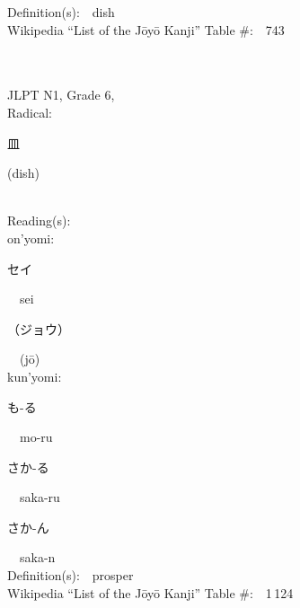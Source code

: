 \begin{multicols}{2}
Definition(s):\ \ dish \\
Wikipedia ``List of the J\=oy\=o Kanji'' Table \#:\ \ 743 \\
\ \ \\
{\fontsize{34pt}{40pt}  }\ \ \\  %
{JLPT N1, Grade 6, \\Radical:\ \ {\begin{CJK}{UTF8}{min} 皿 \end{CJK}} (dish) } \\
Reading(s):\ \ \\
{\hspace*{1em}}on'yomi:\ \ \\
{\hspace*{2em}}{\begin{CJK}{UTF8}{min} セイ \end{CJK}}\ \ sei\ \ \\
{\hspace*{2em}}{\begin{CJK}{UTF8}{min} （ジョウ） \end{CJK}}\ \ (j\=o)\ \ \\
{\hspace*{1em}}kun'yomi:\ \ \\
{\hspace*{2em}}{\begin{CJK}{UTF8}{min} も-る \end{CJK}}\ \ mo-ru\ \ \\
{\hspace*{2em}}{\begin{CJK}{UTF8}{min} さか-る \end{CJK}}\ \ saka-ru\ \ \\
{\hspace*{2em}}{\begin{CJK}{UTF8}{min} さか-ん \end{CJK}}\ \ saka-n\ \ \\
Definition(s):\ \ prosper \\
Wikipedia ``List of the J\=oy\=o Kanji'' Table \#:\ \ 1\,124 \\
\ \ \\
{\fontsize{34pt}{40pt}  }\ \ \\  %

\end{multicols}
